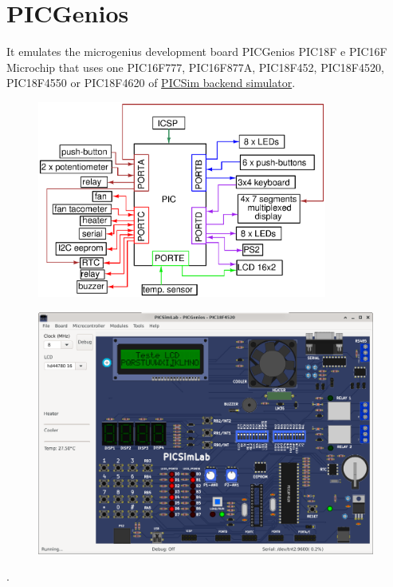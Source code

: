 \section{PICGenios}

It emulates the microgenius development board PICGenios PIC18F e PIC16F Microchip that uses one PIC16F777,
PIC16F877A, PIC18F452, PIC18F4520, PIC18F4550 or PIC18F4620 of \hyperlink{def:PICSim}{PICSim backend simulator}.

\begin{figure}[H]
\center
\includegraphics[width=0.85\textwidth]{img/blocks_p4.eps} 
\end{figure} 


\begin{figure}[H]
\center
\includegraphics[width=0.99\textwidth]{img/picsimlab4.png} 
\end{figure} 

.\vspace{0.5cm}

